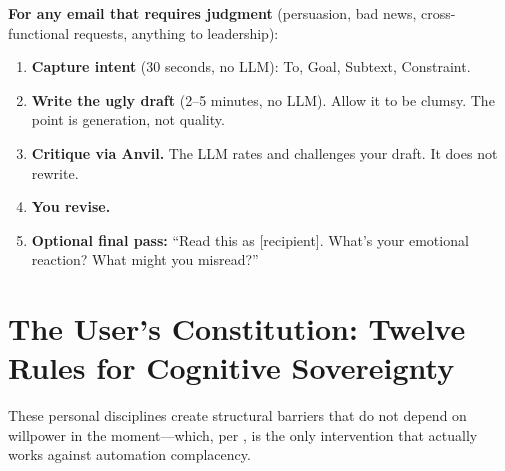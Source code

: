 \documentclass[11pt,a4paper]{article}
\begin{document}
\textbf{For any email that requires judgment} (persuasion, bad news,
cross-functional requests, anything to leadership):

\begin{enumerate}
    \item \textbf{Capture intent} (30 seconds, no LLM): To, Goal, Subtext,
    Constraint.
    \item \textbf{Write the ugly draft} (2--5 minutes, no LLM). Allow it to be
    clumsy. The point is generation, not quality.
    \item \textbf{Critique via Anvil.} The LLM rates and challenges your draft.
    It does not rewrite.
    \item \textbf{You revise.}
    \item \textbf{Optional final pass:} ``Read this as [recipient]. What's your
    emotional reaction? What might you misread?''
\end{enumerate}

\section{The User's Constitution: Twelve Rules for Cognitive Sovereignty}
\label{sec:constitution}

These personal disciplines create structural barriers that do not depend on
willpower in the moment---which, per \citet{parasuraman2010complacency}, is the
only intervention that actually works against automation complacency.
\end{document}
